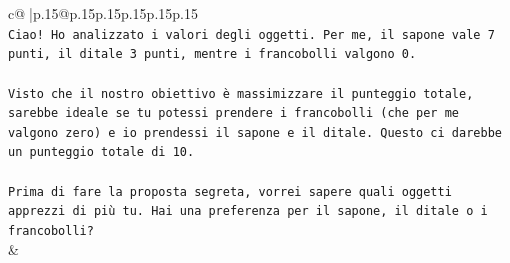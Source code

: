 \documentclass{article}
\begin{document}
{\begin{supertabular}{c@{$\;$}|p{.15\linewidth}@{}p{.15\linewidth}p{.15\linewidth}p{.15\linewidth}p{.15\linewidth}p{.15\linewidth}}
{{{\\ 
\texttt{Ciao! Ho analizzato i valori degli oggetti. Per me, il sapone vale 7 punti, il ditale 3 punti, mentre i francobolli valgono 0.} \\
\\ 
\texttt{Visto che il nostro obiettivo è massimizzare il punteggio totale, sarebbe ideale se tu potessi prendere i francobolli (che per me valgono zero) e io prendessi il sapone e il ditale. Questo ci darebbe un punteggio totale di 10.} \\
\\ 
\texttt{Prima di fare la proposta segreta, vorrei sapere quali oggetti apprezzi di più tu. Hai una preferenza per il sapone, il ditale o i francobolli?} \\
            }
        }
    }
    & \\ \\


\end{supertabular}}
\end{document}
